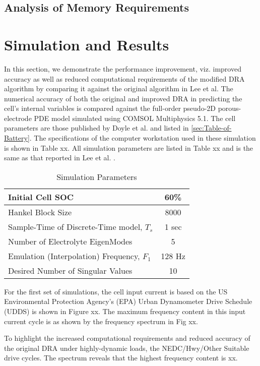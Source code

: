\subsection{Analysis of Memory Requirements}

\section{Simulation and Results\label{sec:Results} }

In this section, we demonstrate the performance improvement, viz.
improved accuracy as well as reduced computational requirements of
the modified DRA algorithm by comparing it against the original algorithm
in Lee et al. The numerical accuracy of both the original and improved
DRA in predicting the cell's internal variables is compared against
the full-order pseudo-2D porous-electrode PDE model simulated using
COMSOL Multiphysics 5.1. The cell parameters are those published by
Doyle et al. and listed in \ref{sec:Table-of-Battery}. The specifications
of the computer workstation used in these simulation is shown in Table
xx. All simulation parameters are listed in Table xx and is the same
as that reported in Lee et al. .

\begin{table}

\caption{Simulation Parameters}

\begin{tabular}{|l|c|}
\hline
Initial Cell SOC & 60\%\tabularnewline
\hline
\hline
Hankel Block Size & 8000\tabularnewline
\hline
Sample-Time of Discrete-Time model, $T_{s}$ & 1 sec\tabularnewline
\hline
Number of Electrolyte EigenModes & 5\tabularnewline
\hline
Emulation (Interpolation) Frequency, $F_{1}$ & 128 Hz\tabularnewline
\hline
Desired Number of Singular Values & 10\tabularnewline
\hline
\end{tabular}

\end{table}

For the first set of simulations, the cell input current is based
on the US Environmental Protection Agency's (EPA) Urban Dynamometer
Drive Schedule (UDDS) is shown in Figure xx. The maximum frequency
content in this input current cycle is as shown by the frequency spectrum
in Fig xx.

To highlight the increased computational requirements and reduced
accuracy of the original DRA under highly-dynamic loads, the NEDC/Hwy/Other
Suitable drive cycles. The spectrum reveals that the highest frequency
content is xx.

